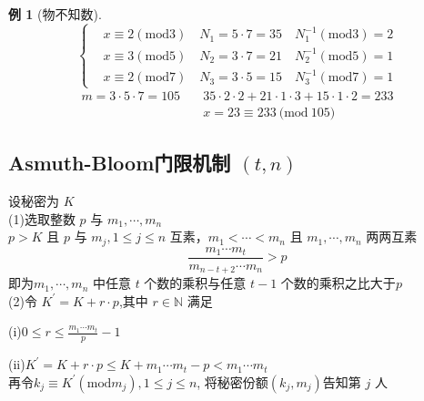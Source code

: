 \documentclass[10t, a4paper, oneside]{ctexbook}
\newtheorem{example}[theorem]{例}
\begin{document}
\begin{example}[物不知数]
    $$
    \begin{cases}
    &x\equiv2(\mathrm{mod}3)\quad N_1=5\cdot7=35\quad N_1^{-1}(\mathrm{mod}3)=2\\
    &x\equiv3(\mathrm{mod}5)\quad N_2=3\cdot7=21\quad N_2^{-1}(\mathrm{mod}5)=1\\
    &x\equiv2(\mathrm{mod}7)\quad N_3=3\cdot5=15\quad N_3^{-1}(\mathrm{mod}7)=1
    \end{cases}
    $$
    $$\begin{aligned}m=3\cdot5\cdot7=105&\quad35\cdot2\cdot2+21\cdot1\cdot3+15\cdot1\cdot2=233\\&\quad x=23\equiv233\mathrm{~(mod~}105)\end{aligned}$$
\end{example}  

\subsection{Asmuth-Bloom门限机制 $(t,n)$}

设秘密为 $K$\\
(1)选取整数 $p$ 与 $m_1,\cdots,m_n$\\
$p>K$ 且 $p$ 与 $m_j,1\leq j\leq n$ 互素，$m_1<\cdots<m_n$ 且 $m_1,\cdots,m_n$ 两两互素 \\
$$\frac{m_1\cdots m_t}{m_{n-t+2}\cdots m_n}>p$$
即为$m_1,\cdots,m_n$ 中任意 $t$ 个数的乘积与任意 $t-1$ 个数的乘积之比大于$p$\\
(2)令 $K^{\prime}=K+r\cdot p$,其中 $r\in\mathbb{N}$ 满足\par
(i)$0\leq r\leq\frac{m_1\cdots m_t}p-1$\par
(ii)$K^{\prime}=K+r\cdot p\leq K+m_1\cdots m_t-p<m_1\cdots m_t$\\
再令$k_j\equiv K^{\prime}({\mathrm{mod}}m_j),1\leq j\leq n$, 将秘密份额$(k_j,m_j)$告知第 $j$ 人
\end{document}
